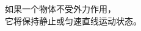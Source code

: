 \documentclass[preview]{standalone}
\begin{document}
\begin{center}
如果一个物体不受外力作用，\\它将保持静止或匀速直线运动状态。
\end{center}
\end{document}
